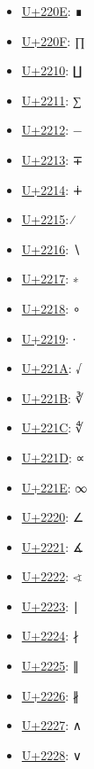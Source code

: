 \begin{itemize}
	\item \href{https://decodeunicode.org/en/u+220E}{U+220E}: ∎
	\item \href{https://decodeunicode.org/en/u+220F}{U+220F}: ∏
	\item \href{https://decodeunicode.org/en/u+2210}{U+2210}: ∐
	\item \href{https://decodeunicode.org/en/u+2211}{U+2211}: ∑
	\item \href{https://decodeunicode.org/en/u+2212}{U+2212}: −
	\item \href{https://decodeunicode.org/en/u+2213}{U+2213}: ∓
	\item \href{https://decodeunicode.org/en/u+2214}{U+2214}: ∔
	\item \href{https://decodeunicode.org/en/u+2215}{U+2215}: ∕
	\item \href{https://decodeunicode.org/en/u+2216}{U+2216}: ∖
	\item \href{https://decodeunicode.org/en/u+2217}{U+2217}: ∗
	\item \href{https://decodeunicode.org/en/u+2218}{U+2218}: ∘
	\item \href{https://decodeunicode.org/en/u+2219}{U+2219}: ∙
	\item \href{https://decodeunicode.org/en/u+221A}{U+221A}: √
	\item \href{https://decodeunicode.org/en/u+221B}{U+221B}: ∛
	\item \href{https://decodeunicode.org/en/u+221C}{U+221C}: ∜
	\item \href{https://decodeunicode.org/en/u+221D}{U+221D}: ∝
	\item \href{https://decodeunicode.org/en/u+221E}{U+221E}: ∞
	\item \href{https://decodeunicode.org/en/u+2220}{U+2220}: ∠
	\item \href{https://decodeunicode.org/en/u+2221}{U+2221}: ∡
	\item \href{https://decodeunicode.org/en/u+2222}{U+2222}: ∢
	\item \href{https://decodeunicode.org/en/u+2223}{U+2223}: ∣
	\item \href{https://decodeunicode.org/en/u+2224}{U+2224}: ∤
	\item \href{https://decodeunicode.org/en/u+2225}{U+2225}: ∥
	\item \href{https://decodeunicode.org/en/u+2226}{U+2226}: ∦
	\item \href{https://decodeunicode.org/en/u+2227}{U+2227}: ∧
	\item \href{https://decodeunicode.org/en/u+2228}{U+2228}: ∨

\end{itemize}
